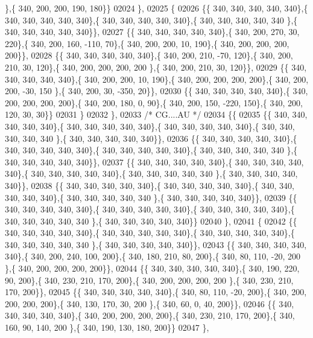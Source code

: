 \begin{DoxyCode}
      \},\{ 340, 200, 200, 190, 180\}\}
02024 \},
02025 \{
02026 \{\{ 340, 340, 340, 340, 340\},\{ 340, 340, 340, 340, 340\},\{ 340, 340, 340, 340, 340\},\{ 340, 340, 340, 340, 340
      \},\{ 340, 340, 340, 340, 340\}\},
02027 \{\{ 340, 340, 340, 340, 340\},\{ 340, 200, 270,  30, 220\},\{ 340, 200, 160, -110,  70\},\{ 340, 200, 200,  10, 
      190\},\{ 340, 200, 200, 200, 200\}\},
02028 \{\{ 340, 340, 340, 340, 340\},\{ 340, 200, 210, -70, 120\},\{ 340, 200, 210,  30, 120\},\{ 340, 200, 200, 200, 200
      \},\{ 340, 200, 210,  30, 120\}\},
02029 \{\{ 340, 340, 340, 340, 340\},\{ 340, 200, 200,  10, 190\},\{ 340, 200, 200, 200, 200\},\{ 340, 200, 200, -30, 150
      \},\{ 340, 200,  30, -350,  20\}\},
02030 \{\{ 340, 340, 340, 340, 340\},\{ 340, 200, 200, 200, 200\},\{ 340, 200, 180,   0,  90\},\{ 340, 200, 150, -220, 
      150\},\{ 340, 200, 120,  30,  30\}\}
02031 \}
02032 \},
02033 \textcolor{comment}{/* CG....AU */}
02034 \{\{
02035 \{\{ 340, 340, 340, 340, 340\},\{ 340, 340, 340, 340, 340\},\{ 340, 340, 340, 340, 340\},\{ 340, 340, 340, 340, 340
      \},\{ 340, 340, 340, 340, 340\}\},
02036 \{\{ 340, 340, 340, 340, 340\},\{ 340, 340, 340, 340, 340\},\{ 340, 340, 340, 340, 340\},\{ 340, 340, 340, 340, 340
      \},\{ 340, 340, 340, 340, 340\}\},
02037 \{\{ 340, 340, 340, 340, 340\},\{ 340, 340, 340, 340, 340\},\{ 340, 340, 340, 340, 340\},\{ 340, 340, 340, 340, 340
      \},\{ 340, 340, 340, 340, 340\}\},
02038 \{\{ 340, 340, 340, 340, 340\},\{ 340, 340, 340, 340, 340\},\{ 340, 340, 340, 340, 340\},\{ 340, 340, 340, 340, 340
      \},\{ 340, 340, 340, 340, 340\}\},
02039 \{\{ 340, 340, 340, 340, 340\},\{ 340, 340, 340, 340, 340\},\{ 340, 340, 340, 340, 340\},\{ 340, 340, 340, 340, 340
      \},\{ 340, 340, 340, 340, 340\}\}
02040 \},
02041 \{
02042 \{\{ 340, 340, 340, 340, 340\},\{ 340, 340, 340, 340, 340\},\{ 340, 340, 340, 340, 340\},\{ 340, 340, 340, 340, 340
      \},\{ 340, 340, 340, 340, 340\}\},
02043 \{\{ 340, 340, 340, 340, 340\},\{ 340, 200, 240, 100, 200\},\{ 340, 180, 210,  80, 200\},\{ 340,  80, 110, -20, 200
      \},\{ 340, 200, 200, 200, 200\}\},
02044 \{\{ 340, 340, 340, 340, 340\},\{ 340, 190, 220,  90, 200\},\{ 340, 230, 210, 170, 200\},\{ 340, 200, 200, 200, 200
      \},\{ 340, 230, 210, 170, 200\}\},
02045 \{\{ 340, 340, 340, 340, 340\},\{ 340,  80, 110, -20, 200\},\{ 340, 200, 200, 200, 200\},\{ 340, 130, 170,  30, 200
      \},\{ 340,  60,   0,  40, 200\}\},
02046 \{\{ 340, 340, 340, 340, 340\},\{ 340, 200, 200, 200, 200\},\{ 340, 230, 210, 170, 200\},\{ 340, 160,  90, 140, 200
      \},\{ 340, 190, 130, 180, 200\}\}
02047 \},

\end{DoxyCode}
